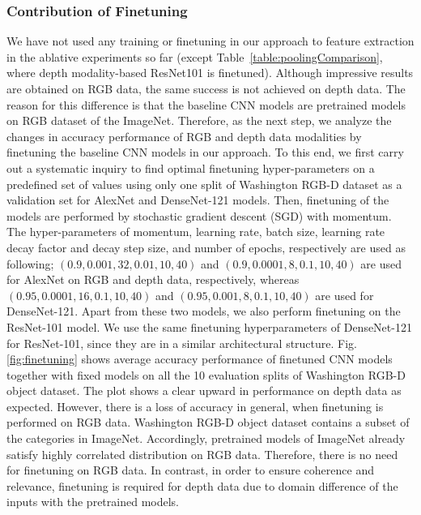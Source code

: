 \subsubsection{Contribution of Finetuning} \label{sec.exp.ma.finetuning}
We have not used any training or finetuning in our approach to feature extraction in the ablative experiments so far (except Table~\ref{table:poolingComparison}, where depth modality-based ResNet101 is finetuned). Although impressive results are obtained on RGB data, the same success is not achieved on depth data. The reason for this difference is that the baseline CNN models are pretrained models on RGB dataset of the ImageNet. Therefore, as the next step, we analyze the changes in accuracy performance of RGB and depth data modalities by finetuning the baseline CNN models in our approach. To this end, we first carry out a systematic inquiry to find optimal finetuning hyper-parameters on a predefined set of values using only one split of Washington RGB-D dataset as a validation set for AlexNet and DenseNet-121 models. Then, finetuning of the models are performed by stochastic gradient descent (SGD) with momentum. The hyper-parameters of momentum, learning rate, batch size, learning rate decay factor and decay step size, and number of epochs, respectively are used as following; $(0.9, 0.001, 32, 0.01, 10, 40)$ and $(0.9, 0.0001, 8, 0.1, 10, 40)$ are used for AlexNet on RGB and depth data, respectively, whereas $(0.95, 0.0001, 16, 0.1, 10, 40)$ and $(0.95, 0.001, 8, 0.1, 10, 40)$ are used for DenseNet-121. Apart from these two models, we also perform finetuning on the ResNet-101 model. We use the same finetuning hyperparameters of DenseNet-121 for ResNet-101, since they are in a similar architectural structure. Fig. \ref{fig:finetuning} shows average accuracy performance of finetuned CNN models together with fixed models on all the 10 evaluation splits of Washington RGB-D object dataset. The plot shows a clear upward in performance on depth data as expected. However, there is a loss of accuracy in general, when finetuning is performed on RGB data. Washington RGB-D object dataset contains a subset of the categories in ImageNet. Accordingly, pretrained models of ImageNet already satisfy highly correlated distribution on RGB data. Therefore, there is no need for finetuning on RGB data. In contrast, in order to ensure coherence and relevance, finetuning is required for depth data due to domain difference of the inputs with the pretrained models.

